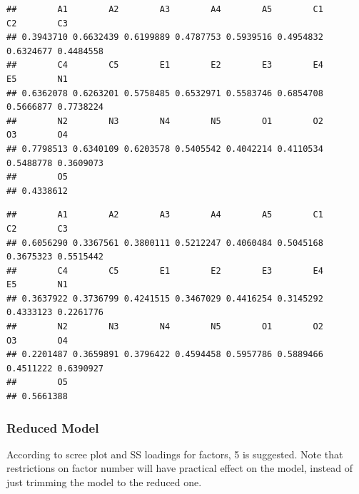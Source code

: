 \documentclass[
]{ctexart}
\newenvironment{Shaded}{\begin{snugshade}}{\end{snugshade}}
\newcommand{\CommentTok}[1]{\textcolor[rgb]{0.56,0.35,0.01}{\textit{#1}}}
\newcommand{\DecValTok}[1]{\textcolor[rgb]{0.00,0.00,0.81}{#1}}
\newcommand{\FunctionTok}[1]{\textcolor[rgb]{0.13,0.29,0.53}{\textbf{#1}}}
\newcommand{\NormalTok}[1]{#1}
\newcommand{\SpecialCharTok}[1]{\textcolor[rgb]{0.81,0.36,0.00}{\textbf{#1}}}
\begin{document}
\begin{Shaded}
\end{Shaded}

\begin{verbatim}
##        A1        A2        A3        A4        A5        C1        C2        C3 
## 0.3943710 0.6632439 0.6199889 0.4787753 0.5939516 0.4954832 0.6324677 0.4484558 
##        C4        C5        E1        E2        E3        E4        E5        N1 
## 0.6362078 0.6263201 0.5758485 0.6532971 0.5583746 0.6854708 0.5666877 0.7738224 
##        N2        N3        N4        N5        O1        O2        O3        O4 
## 0.7798513 0.6340109 0.6203578 0.5405542 0.4042214 0.4110534 0.5488778 0.3609073 
##        O5 
## 0.4338612
\end{verbatim}

\begin{Shaded}
\end{Shaded}

\begin{verbatim}
##        A1        A2        A3        A4        A5        C1        C2        C3 
## 0.6056290 0.3367561 0.3800111 0.5212247 0.4060484 0.5045168 0.3675323 0.5515442 
##        C4        C5        E1        E2        E3        E4        E5        N1 
## 0.3637922 0.3736799 0.4241515 0.3467029 0.4416254 0.3145292 0.4333123 0.2261776 
##        N2        N3        N4        N5        O1        O2        O3        O4 
## 0.2201487 0.3659891 0.3796422 0.4594458 0.5957786 0.5889466 0.4511222 0.6390927 
##        O5 
## 0.5661388
\end{verbatim}

\hypertarget{reduced-model}{%
\subsubsection{Reduced Model}\label{reduced-model}}

According to scree plot and SS loadings for factors, 5 is suggested.
Note that restrictions on factor number will have practical effect on
the model, instead of just trimming the model to the reduced one.
\end{document}
